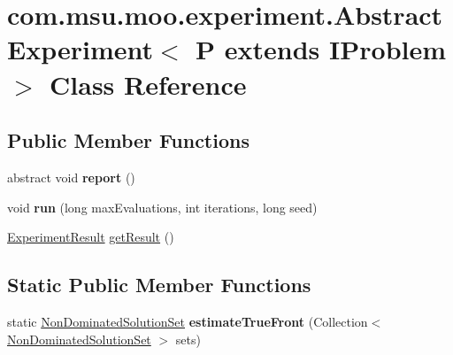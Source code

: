 \hypertarget{classcom_1_1msu_1_1moo_1_1experiment_1_1AbstractExperiment_3_01P_01extends_01IProblem_01_4}{\section{com.\-msu.\-moo.\-experiment.\-Abstract\-Experiment$<$ P extends I\-Problem $>$ Class Reference}
\label{classcom_1_1msu_1_1moo_1_1experiment_1_1AbstractExperiment_3_01P_01extends_01IProblem_01_4}
}
\subsection*{Public Member Functions}
\begin{DoxyCompactItemize}
\item 
\hypertarget{classcom_1_1msu_1_1moo_1_1experiment_1_1AbstractExperiment_3_01P_01extends_01IProblem_01_4_a6da0cc245c9ec4eff288b73fdff8a4c9}{abstract void {\bfseries report} ()}\label{classcom_1_1msu_1_1moo_1_1experiment_1_1AbstractExperiment_3_01P_01extends_01IProblem_01_4_a6da0cc245c9ec4eff288b73fdff8a4c9}

\item 
\hypertarget{classcom_1_1msu_1_1moo_1_1experiment_1_1AbstractExperiment_3_01P_01extends_01IProblem_01_4_a56a01b557b3f59d10a1f22659882b705}{void {\bfseries run} (long max\-Evaluations, int iterations, long seed)}\label{classcom_1_1msu_1_1moo_1_1experiment_1_1AbstractExperiment_3_01P_01extends_01IProblem_01_4_a56a01b557b3f59d10a1f22659882b705}

\item 
\hyperlink{classcom_1_1msu_1_1moo_1_1experiment_1_1ExperimentResult}{Experiment\-Result} \hyperlink{classcom_1_1msu_1_1moo_1_1experiment_1_1AbstractExperiment_3_01P_01extends_01IProblem_01_4_ade7890252c0b9e5e523d5c19b289dbb0}{get\-Result} ()
\end{DoxyCompactItemize}
\subsection*{Static Public Member Functions}
\begin{DoxyCompactItemize}
\item 
\hypertarget{classcom_1_1msu_1_1moo_1_1experiment_1_1AbstractExperiment_3_01P_01extends_01IProblem_01_4_a8096c2b69a833a9692726e14dda9bc6e}{static \hyperlink{classcom_1_1msu_1_1moo_1_1model_1_1solution_1_1NonDominatedSolutionSet}{Non\-Dominated\-Solution\-Set} {\bfseries estimate\-True\-Front} (Collection$<$ \hyperlink{classcom_1_1msu_1_1moo_1_1model_1_1solution_1_1NonDominatedSolutionSet}{Non\-Dominated\-Solution\-Set} $>$ sets)}\label{classcom_1_1msu_1_1moo_1_1experiment_1_1AbstractExperiment_3_01P_01extends_01IProblem_01_4_a8096c2b69a833a9692726e14dda9bc6e}

\end{DoxyCompactItemize}
